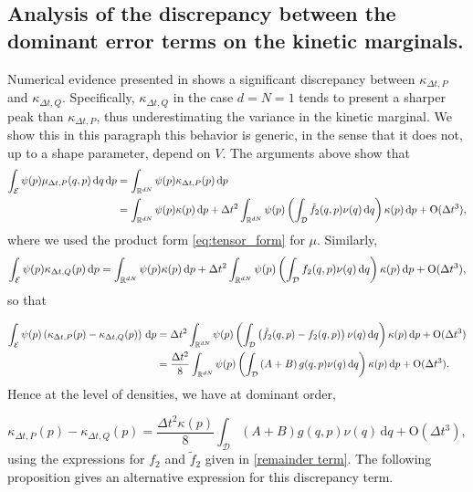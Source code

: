 \subsection{Analysis of the discrepancy between the dominant error terms on the kinetic marginals.}\label{discrepancy term kinetic}
Numerical evidence presented in \cite{KK22} shows a significant discrepancy between $\kappa_{\Delta t,P}$ and $\kappa_{\Delta t,Q}$.
Specifically, $\kappa_{\Delta t,Q}$ in the case $d=N=1$ tends to present a sharper peak than $\kappa_{\Delta t,P}$, thus underestimating the variance in the kinetic marginal.
 We show this in this paragraph this behavior is generic, in the sense that it does not, up to a shape parameter, depend on $V$.
The arguments above show that
\begin{equation}
  \begin{aligned}
    \int_{\mathcal E}\psi(p)\mu_{\Delta t,P}(q,p)\,\mathrm{d}q\,\mathrm{d}p&=\int_{\mathbb{R}^{dN}}\psi(p)\kappa_{\Delta t,P}(p)\,\mathrm{d}p\\
    &=\int_{\mathbb{R}^{dN}}\psi(p)\kappa(p)\,\mathrm{d}p+\Delta t^2\int_{\mathbb{R}^{dN}}\psi(p)\left(\int_{\mathcal D} \tilde f_2(q,p)\nu(q)\,\mathrm{d}q\right)\kappa(p)\,\mathrm{d}p +\mathrm{O}(\Delta t^3),  
  \end{aligned}
\end{equation}
where we used the product form \eqref{eq:tensor_form} for $\mu$. Similarly,
\begin{equation}
  \int_{\mathcal E}\psi(p)\kappa_{\Delta t,Q}(p)\,\mathrm{d}p=\int_{\mathbb{R}^{dN}}\psi(p)\kappa(p)\,\mathrm{d}p+\Delta t^2\int_{\mathbb{R}^{dN}}\psi(p)\left(\int_{\mathcal D}f_2(q,p)\nu(q)\,\mathrm{d}q\right)\kappa(p)\,\mathrm{d}p +\mathrm{O}(\Delta t^3),
\end{equation}
so that 

\begin{align*}
  \int_{\mathcal E}\psi(p)\left(\kappa_{\Delta t,P}(p)-\kappa_{\Delta t,Q}(p)\right)\,\mathrm{d}p&=\Delta t^2\int_{\mathbb{R}^{dN}}\psi(p)\left(\int_{\mathcal D}\left(\tilde f_2(q,p)-f_2(q,p)\right)\nu(q)\,\mathrm{d}q\right)\kappa(p)\,\mathrm{d}p +\mathrm{O}(\Delta t^3)\\
  &=\frac{\Delta t^2}8\int_{\mathbb{R}^{dN}}\psi(p)\left(\int_{\mathcal D}\left(A+B\right)g(q,p)\nu(q)\,\mathrm{d}q\right)\kappa(p)\,\mathrm{d}p +\mathrm{O}(\Delta t^3).
\end{align*}
Hence at the level of densities, we have at dominant order,

$$ \kappa_{\Delta t,P}(p)- \kappa_{\Delta t,Q}(p)=\frac{\Delta t^2\kappa(p)}8\int_{\mathcal D}\left(A+B\right)g(q,p)\nu(q)\,\mathrm{d}q + \mathrm{O}(\Delta t^3),$$
using the expressions for $f_2$ and $\tilde f_2$ given in \eqref{remainder term}. The following proposition gives an alternative expression for this discrepancy term.

